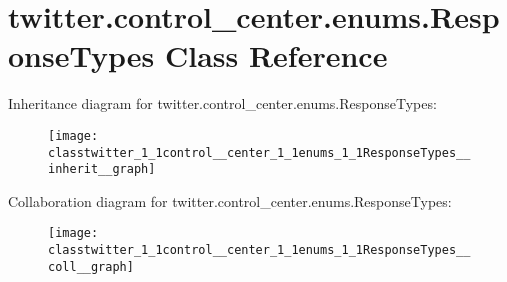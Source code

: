 \hypertarget{classtwitter_1_1control__center_1_1enums_1_1ResponseTypes}{}\section{twitter.\+control\+\_\+center.\+enums.\+Response\+Types Class Reference}
\label{classtwitter_1_1control__center_1_1enums_1_1ResponseTypes}


Inheritance diagram for twitter.\+control\+\_\+center.\+enums.\+Response\+Types\+:\nopagebreak
\begin{figure}[H]
\begin{center}
\leavevmode
\texttt{[image: classtwitter\_1\_1control\_\_center\_1\_1enums\_1\_1ResponseTypes\_\_inherit\_\_graph]}
\end{center}
\end{figure}


Collaboration diagram for twitter.\+control\+\_\+center.\+enums.\+Response\+Types\+:\nopagebreak
\begin{figure}[H]
\begin{center}
\leavevmode
\texttt{[image: classtwitter\_1\_1control\_\_center\_1\_1enums\_1\_1ResponseTypes\_\_coll\_\_graph]}
\end{center}
\end{figure}
